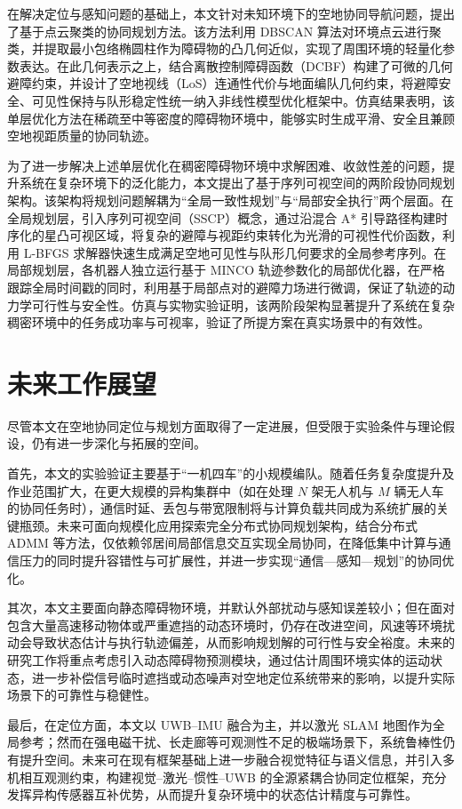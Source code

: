 在解决定位与感知问题的基础上，本文针对未知环境下的空地协同导航问题，提出了基于点云聚类的协同规划方法。该方法利用 DBSCAN 算法对环境点云进行聚类，并提取最小包络椭圆柱作为障碍物的凸几何近似，实现了周围环境的轻量化参数表达。在此几何表示之上，结合离散控制障碍函数（DCBF）构建了可微的几何避障约束，并设计了空地视线（LoS）连通性代价与地面编队几何约束，将避障安全、可见性保持与队形稳定性统一纳入非线性模型优化框架中。仿真结果表明，该单层优化方法在稀疏至中等密度的障碍物环境中，能够实时生成平滑、安全且兼顾空地视距质量的协同轨迹。

为了进一步解决上述单层优化在稠密障碍物环境中求解困难、收敛性差的问题，提升系统在复杂环境下的泛化能力，本文提出了基于序列可视空间的两阶段协同规划架构。该架构将规划问题解耦为“全局一致性规划”与“局部安全执行”两个层面。在全局规划层，引入序列可视空间（SSCP）概念，通过沿混合 A* 引导路径构建时序化的星凸可视区域，将复杂的避障与视距约束转化为光滑的可视性代价函数，利用 L-BFGS 求解器快速生成满足空地可见性与队形几何要求的全局参考序列。在局部规划层，各机器人独立运行基于 MINCO 轨迹参数化的局部优化器，在严格跟踪全局时间戳的同时，利用基于局部点对的避障力场进行微调，保证了轨迹的动力学可行性与安全性。仿真与实物实验证明，该两阶段架构显著提升了系统在复杂稠密环境中的任务成功率与可视率，验证了所提方案在真实场景中的有效性。

\section{未来工作展望}

尽管本文在空地协同定位与规划方面取得了一定进展，但受限于实验条件与理论假设，仍有进一步深化与拓展的空间。

首先，本文的实验验证主要基于“一机四车”的小规模编队。随着任务复杂度提升及作业范围扩大，在更大规模的异构集群中（如在处理 $N$ 架无人机与 $M$ 辆无人车的协同任务时），通信时延、丢包与带宽限制将与计算负载共同成为系统扩展的关键瓶颈。未来可面向规模化应用探索完全分布式协同规划架构，结合分布式 ADMM 等方法，仅依赖邻居间局部信息交互实现全局协同，在降低集中计算与通信压力的同时提升容错性与可扩展性，并进一步实现“通信—感知—规划”的协同优化。

其次，本文主要面向静态障碍物环境，并默认外部扰动与感知误差较小；但在面对包含大量高速移动物体或严重遮挡的动态环境时，仍存在改进空间，风速等环境扰动会导致状态估计与执行轨迹偏差，从而影响规划解的可行性与安全裕度。未来的研究工作将重点考虑引入动态障碍物预测模块，通过估计周围环境实体的运动状态，进一步补偿信号临时遮挡或动态噪声对空地定位系统带来的影响，以提升实际场景下的可靠性与稳健性。

最后，在定位方面，本文以 UWB–IMU 融合为主，并以激光 SLAM 地图作为全局参考；然而在强电磁干扰、长走廊等可观测性不足的极端场景下，系统鲁棒性仍有提升空间。未来可在现有框架基础上进一步融合视觉特征与语义信息，并引入多机相互观测约束，构建视觉–激光–惯性–UWB 的全源紧耦合协同定位框架，充分发挥异构传感器互补优势，从而提升复杂环境中的状态估计精度与可靠性。
